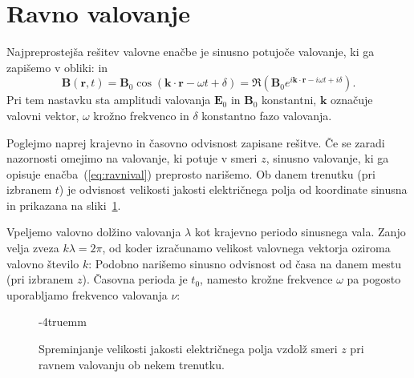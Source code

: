 \section{Ravno valovanje}
Najpreprostejša rešitev valovne enačbe je sinusno potujoče valovanje, ki ga zapišemo
v obliki:
in 
\begin{equation}
\mathbf{B}(\mathbf{r},t) = \mathbf{B}_0 \cos \left(\mathbf{k}\cdot \mathbf{r} - \omega t + \delta\right) = 
\Re\left(\mathbf{B}_0 e^{i\mathbf{k}\cdot \mathbf{r} - i\omega t + i\delta}\right)\!\!.
\label{eq:ravnivalB}
\end{equation}
Pri tem nastavku sta amplitudi valovanja $\mathbf{E}_0$ in $\mathbf{B}_0$ konstantni, 
$\mathbf{k}$ označuje valovni vektor,
$\omega$ krožno frekvenco in $\delta$ konstantno fazo
valovanja.

Poglejmo naprej krajevno in časovno odvisnost zapisane rešitve. Če se zaradi nazornosti 
omejimo na valovanje, ki potuje v smeri $z$, sinusno valovanje, ki ga opisuje 
enačba~(\ref{eq:ravnival}) preprosto narišemo. Ob danem trenutku (pri izbranem $t$) je odvisnost 
velikosti jakosti električnega polja od koordinate sinusna in prikazana na sliki~\ref{fig:03_sinus}.  

Vpeljemo valovno dolžino valovanja $\lambda$ kot krajevno periodo sinusnega vala.
Zanjo velja zveza $k\lambda = 2\pi$, od koder izračunamo velikost valovnega vektorja oziroma 
valovno število $k$:
Podobno narišemo sinusno odvisnost od časa na danem mestu (pri izbranem $z$). 
Časovna perioda je $t_0$, namesto krožne frekvence $\omega$ pa pogosto uporabljamo 
frekvenco valovanja $\nu$: 
\begin{figure}[!h]
\centering
\def\svgwidth{90truemm} 

\caption{Spreminjanje velikosti jakosti električnega polja vzdolž smeri $z$ pri ravnem valovanju 
ob nekem trenutku.}
\label{fig:03_sinus}
\vglue-4truemm
\end{figure}

